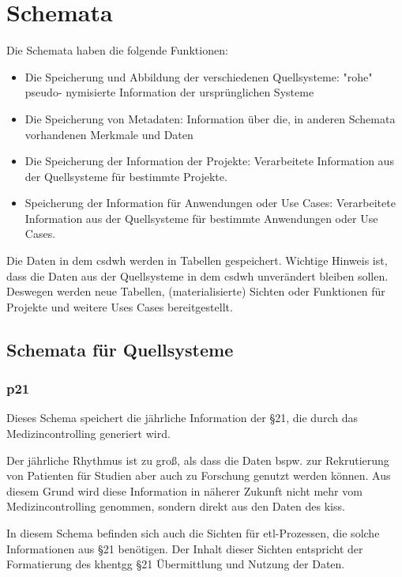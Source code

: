 \chapter{Schemata}
\label{ch:schema}

	Die Schemata haben die folgende Funktionen:
	\begin{itemize}
		\item Die Speicherung und Abbildung der verschiedenen Quellsysteme: "rohe" pseudo- nymisierte Information der ursprünglichen Systeme
		\item Die Speicherung von Metadaten: Information über die, in anderen Schemata vorhandenen Merkmale und Daten 
		\item Die Speicherung der Information der Projekte: Verarbeitete Information aus der Quellsysteme für bestimmte Projekte.
		\item Speicherung der Information für Anwendungen oder Use Cases: Verarbeitete Information aus der Quellsysteme für bestimmte Anwendungen oder Use Cases.
	\end{itemize}
	Die Daten in dem \ac{csdwh} werden in Tabellen gespeichert. Wichtige Hinweis ist, dass die Daten aus der Quellsysteme in dem \ac{csdwh} unverändert bleiben sollen. Deswegen werden neue Tabellen, (materialisierte) Sichten oder Funktionen für Projekte und weitere Uses Cases bereitgestellt.
	
	\section{Schemata für Quellsysteme} \label{sc:sqs}

  \subsection{p21} \label{subsec:p21}
  Dieses Schema speichert die jährliche Information der \S21, die durch das Medizincontrolling generiert wird. 
  
  Der jährliche Rhythmus ist zu groß, als dass die Daten bspw. zur Rekrutierung von Patienten für Studien aber auch zu Forschung genutzt werden können. Aus diesem Grund wird diese Information in näherer Zukunft nicht mehr vom Medizincontrolling genommen, sondern direkt aus den Daten des \ac{kiss}.
  
  In diesem Schema befinden sich auch die Sichten für \ac{etl}-Prozessen, die solche Informationen aus \S21 benötigen. Der Inhalt dieser Sichten entspricht der Formatierung des \ac{khentgg} \S 21 Übermittlung und Nutzung der Daten.

